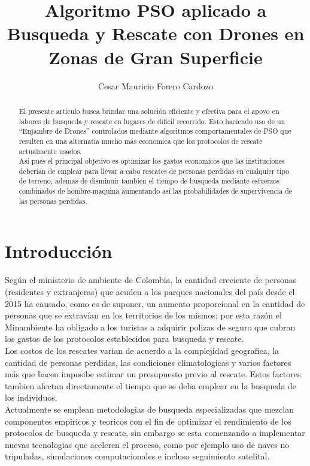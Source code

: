 \documentclass[journal]{IEEEtran}
\author{Cesar Mauricio Forero Cardozo}
\title{Algoritmo PSO aplicado a Busqueda y Rescate con Drones en Zonas de Gran Superficie }
\begin{document}
\maketitle
\begin{abstract}
El presente articulo busca brindar una solución eficiente y efectiva para el apoyo en labores de busqueda y rescate en lugares de dificil recorrido. Esto haciendo uso de un ``Enjambre de Drones'' controlados mediante algoritmos comportamentales de PSO que resulten en una alternatia mucho más economica que los protocolos de rescate actualmente usados.\\

Así pues el principal objetivo es optimizar los gastos economicos que las instituciones deberían de emplear para llevar a cabo rescates de personas perdidas en cualquier tipo de terreno, ademas de disminuir tambien el tiempo de busqueda mediante esfuerzos combinados de hombre-maquina aumentando así las probabilidades de supervivencia de las personas perdidas.
\end{abstract}
\section{Introducción}
Según el ministerio de ambiente de Colombia, la cantidad creciente de personas (residentes y extranjeras) que acuden a los parques nacionales del país desde el 2015 ha causado, como es de suponer, un aumento proporcional en la cantidad de personas que se extravían en los territorios de los mismos; por esta razón el Minambiente ha obligado a los turistas a adquirir polizas de seguro que cubran los gastos de los protocolos establecidos para busqueda y rescate.\\

Los costos de los rescates varian de acuerdo a la complejidad geografica, la cantidad de personas perdidas, las condiciones climatologicas y varios factores más que hacen imposibe estimar un presupuesto previo al rescate. Estos factores tambien afectan directamente el tiempo que se deba emplear en la busqueda de los individuos.\\

Actualmente se emplean metodologias de busqueda especializadas que mezclan componentes empiricos y teoricos con el fin de optimizar el rendimiento de los protocolos de busqueda y rescate, sin embargo se esta comenzando a implementar nuevas tecnologias que aceleren el proceso, como por ejemplo uso de naves no tripuladas, simulaciones computacionales e incluso seguimiento satelital.\\
\end{document}
